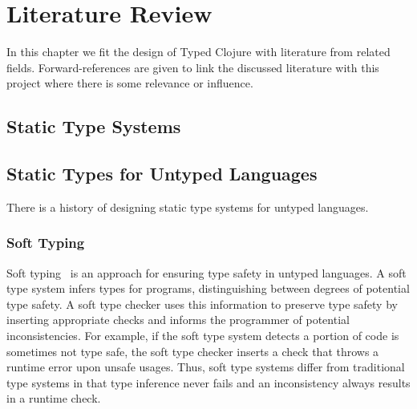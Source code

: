 
\chapter{Literature Review}

In this chapter we fit the design of Typed Clojure with literature from related fields.
Forward-references are given to link the discussed literature with this project
where there is some relevance or influence.


\section{Static Type Systems}



\section{Static Types for Untyped Languages}


There is a history of designing static type systems for untyped languages. 

\subsection{Soft Typing}

Soft typing~\cite{CF91}
is an approach for ensuring type safety in untyped languages.
A soft type system infers types for programs, distinguishing between degrees
of potential type safety.
A soft type checker uses this information to 
preserve type safety by inserting appropriate checks 
and informs the programmer of potential inconsistencies.
For example, if the soft type system detects a portion of code is sometimes not type safe,
the soft type checker inserts a check that throws a runtime error upon unsafe usages.
Thus, soft type systems differ from traditional type systems in that type inference 
never fails and an inconsistency always results in a runtime check.


